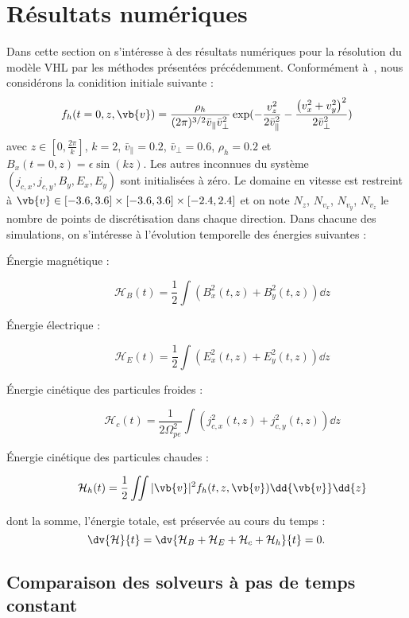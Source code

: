 
\section{Résultats numériques}

Dans cette section on s'intéresse à des résultats numériques pour la résolution du modèle VHL par les méthodes présentées précédemment. Conformément à~\cite{Holderied:2020}, nous considérons la conidition initiale suivante :
$$
  f_h(t=0,z,\vb{v}) = \frac{\rho_h}{(2\pi)^{3/2}\bar{v}_{\|}\bar{v}_\perp^2}\exp( - \frac{v_z^2}{2\bar{v}_{\|}^2} - \frac{\left( v_x^2 + v_y^2 \right)^2}{2\bar{v}_\perp^2} )
$$
avec $z\in[0,\frac{2\pi}{k}]$, $k=2$, $\bar{v}_{\|}=0.2$, $\bar{v}_\perp=0.6$, $\rho_h=0.2$ et $B_x(t=0,z)=\epsilon\sin(kz)$. Les autres inconnues du système $(j_{c,x},j_{c,y},B_y,E_x,E_y)$ sont initialisées à zéro. Le domaine en vitesse est restreint à $\vb{v}\in[-3.6,3.6]\times[-3.6,3.6]\times[-2.4,2.4]$ et on note $N_z$, $N_{v_x}$, $N_{v_y}$, $N_{v_z}$ le nombre de points de discrétisation dans chaque direction. Dans chacune des simulations, on s'intéresse à l'évolution temporelle des énergies suivantes :
\begin{description}
  \item[Énergie magnétique : ] $$\mathcal{H}_B(t) = \frac{1}{2}\int \left( B_x^2(t,z) + B_y^2(t,z) \right)\dd{z}$$
  \item[Énergie électrique : ] $$\mathcal{H}_E(t) = \frac{1}{2}\int \left( E_x^2(t,z) + E_y^2(t,z) \right)\dd{z}$$
  \item[Énergie cinétique des particules froides : ] $$\mathcal{H}_c(t) = \frac{1}{2\Omega_{pe}^2}\int \left( j_{c,x}^2(t,z) + j_{c,y}^2(t,z) \right)\dd{z}$$
  \item[Énergie cinétique des particules chaudes :  ] $$\mathcal{H}_h(t) = \frac{1}{2}\iint |\vb{v}|^2 f_h(t,z,\vb{v}) \dd{\vb{v}}\dd{z}$$
\end{description}
dont la somme, l'énergie totale, est préservée au cours du temps :
$$
  \dv{\mathcal{H}}{t} = \dv{\mathcal{H}_B+\mathcal{H}_E+\mathcal{H}_c+\mathcal{H}_h}{t} = 0.
$$



\subsection{Comparaison des solveurs à pas de temps constant}


